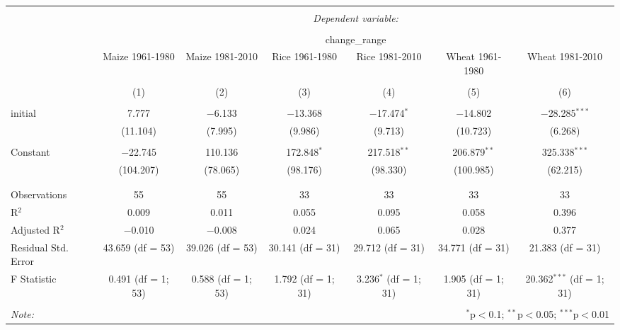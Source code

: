 
\begin{table}[!htbp] \centering 
  \caption{} 
  \label{} 
\begin{tabular}{@{\extracolsep{5pt}}lcccccc} 
\\[-1.8ex]\hline 
\hline \\[-1.8ex] 
 & \multicolumn{6}{c}{\textit{Dependent variable:}} \\ 
\cline{2-7} 
\\[-1.8ex] & \multicolumn{6}{c}{change\_range} \\ 
 & Maize 1961-1980 & Maize 1981-2010 & Rice 1961-1980 & Rice 1981-2010 & Wheat 1961-1980 & Wheat 1981-2010 \\ 
\\[-1.8ex] & (1) & (2) & (3) & (4) & (5) & (6)\\ 
\hline \\[-1.8ex] 
 initial & 7.777 & $-$6.133 & $-$13.368 & $-$17.474$^{*}$ & $-$14.802 & $-$28.285$^{***}$ \\ 
  & (11.104) & (7.995) & (9.986) & (9.713) & (10.723) & (6.268) \\ 
  & & & & & & \\ 
 Constant & $-$22.745 & 110.136 & 172.848$^{*}$ & 217.518$^{**}$ & 206.879$^{**}$ & 325.338$^{***}$ \\ 
  & (104.207) & (78.065) & (98.176) & (98.330) & (100.985) & (62.215) \\ 
  & & & & & & \\ 
\hline \\[-1.8ex] 
Observations & 55 & 55 & 33 & 33 & 33 & 33 \\ 
R$^{2}$ & 0.009 & 0.011 & 0.055 & 0.095 & 0.058 & 0.396 \\ 
Adjusted R$^{2}$ & $-$0.010 & $-$0.008 & 0.024 & 0.065 & 0.028 & 0.377 \\ 
Residual Std. Error & 43.659 (df = 53) & 39.026 (df = 53) & 30.141 (df = 31) & 29.712 (df = 31) & 34.771 (df = 31) & 21.383 (df = 31) \\ 
F Statistic & 0.491 (df = 1; 53) & 0.588 (df = 1; 53) & 1.792 (df = 1; 31) & 3.236$^{*}$ (df = 1; 31) & 1.905 (df = 1; 31) & 20.362$^{***}$ (df = 1; 31) \\ 
\hline 
\hline \\[-1.8ex] 
\textit{Note:}  & \multicolumn{6}{r}{$^{*}$p$<$0.1; $^{**}$p$<$0.05; $^{***}$p$<$0.01} \\ 
\end{tabular} 
\end{table} 
